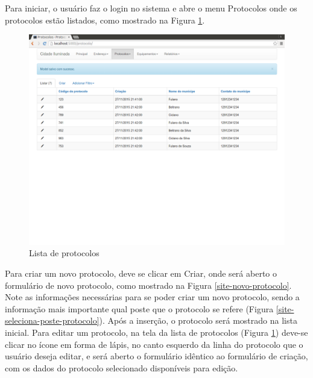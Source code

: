 \documentclass[
	article,			%
	11pt,				%
	oneside,			%
	a4paper,			%
	english,			%
	brazil,				%
	sumario=tradicional
	]{abntex2}
\begin{document}
Para iniciar, o usuário faz o login no sistema e abre o menu Protocolos onde os protocolos estão listados, como mostrado na Figura \ref{site-tela-inicial}.

\begin{figure}[!htbp]
 \centering
 \caption{\label{site-tela-inicial}Lista de protocolos}
 \includegraphics[scale=0.25]{site/1-lista_protocolos.png}
\end{figure}

\clearpage

Para criar um novo protocolo, deve se clicar em Criar, onde será aberto o formulário de novo protocolo, como mostrado na Figura \ref{site-novo-protocolo}.
Note as informações necessárias para se poder criar um novo protocolo, sendo a informação mais importante qual poste que o protocolo se refere (Figura \ref{site-seleciona-poste-protocolo}).
Após a inserção, o protocolo será mostrado na lista inicial.
Para editar um protocolo, na tela da lista de protocolos (Figura \ref{site-tela-inicial}) deve-se clicar no ícone em forma de lápis, no canto esquerdo da linha do protocolo que o usuário deseja editar, e será aberto o formulário idêntico ao formulário de criação, com os dados do protocolo selecionado disponíveis para edição.
\end{document}
